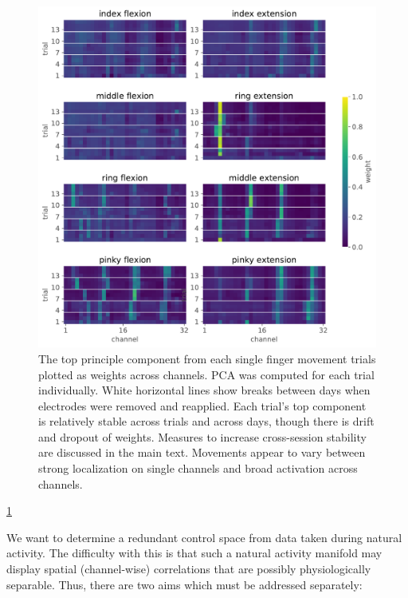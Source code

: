 \documentclass[
  a4paper,
]{article}
\begin{document}
\begin{figure}
\hypertarget{fig:PCA_components}{%
\centering
\includegraphics[width=1\textwidth,height=\textheight]{images/data_analysis/fingers/PCA_components.pdf}
\caption{The top principle component from each single finger movement
trials plotted as weights across channels. PCA was computed for each
trial individually. White horizontal lines show breaks between days when
electrodes were removed and reapplied. Each trial's top component is
relatively stable across trials and across days, though there is drift
and dropout of weights. Measures to increase cross-session stability are
discussed in the main text. Movements appear to vary between strong
localization on single channels and broad activation across
channels.}\label{fig:PCA_components}
}
\end{figure}

\cref{fig:PCA_components}

We want to determine a redundant control space from data taken during
natural activity. The difficulty with this is that such a natural
activity manifold may display spatial (channel-wise) correlations that
are possibly physiologically separable. Thus, there are two aims which
must be addressed separately:
\end{document}
